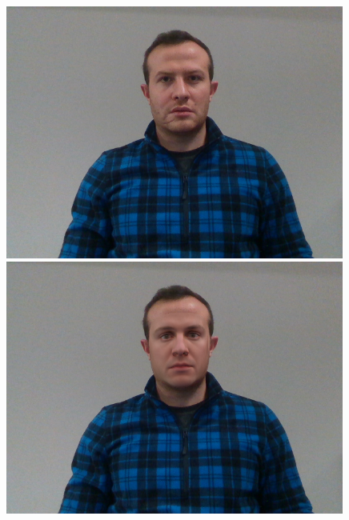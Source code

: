 \begin{figure}[h]
    \begin{minipage}{.325\textwidth}
      \centering
      \includegraphics[width=0.99\textwidth]{Figures/dataset/target/3.png}
    \end{minipage}
    \begin{minipage}{.325\textwidth}
      \centering
      \includegraphics[width=0.99\textwidth]{Figures/dataset/our/3blended.png}
    \end{minipage}
    \begin{minipage}{.325\textwidth}
      \centering

\end{minipage}
\end{figure}
